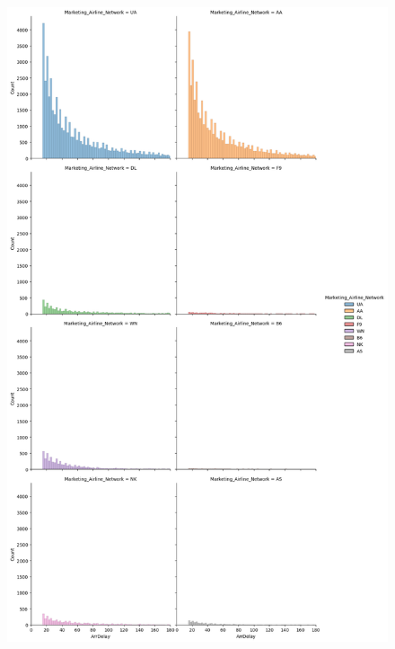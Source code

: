 \documentclass[a4paper,11pt]{article}
\begin{document}
\begin{figure}
    \centering
    \includegraphics*[scale=.40]{../../img/delays_by_airline.png}
    \caption[]{}
    \label{fig:delaybyairline}
\end{figure}
\end{document}
